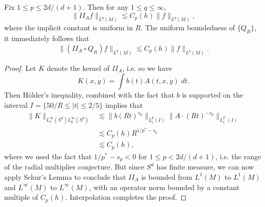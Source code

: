 \begin{lemma} \label{IIALemma}
    Fix $1 \leq p \leq 2d/(d+1)$. Then for any $1 \leq q \leq \infty$,
    \[ \| II_A f \|_{L^q(M)} \lesssim C_p(h) \| f \|_{L^q(M)}, \]
    where the implicit constant is uniform in $R$. The uniform boundedness of $\{ Q_R \}$, it immediately follows that
    \[ \| (II_A \circ Q_R) f \|_{L^q(M)} \lesssim C_p(h) \| f \|_{L^q(M)}. \]
\end{lemma}
\begin{proof}
    Let $K$ denote the kernel of $II_A$, i.e. so we have
    \[ K(x,y) = \int b(t) A(t,x,y)\; dt. \]
    Then H\"{o}lder's inequality, combined with the fact that $b$ is supported on the interval $I = \{ 50/R \leq |t| \leq 2/5 \}$ implies that
    \begin{align*}
        \| K \|_{L^\infty_x(S^d) L^\infty_y(S^d)} &\lesssim \| b (R t)^{s_p} \|_{L^p_t(I)} \| A \cdot (R t)^{-s_p} \|_{L^{p^*}_t(I)}\\
        &\lesssim C_p(h) R^{1/p^* - s_p}\\
        &\lesssim C_p(h),
    \end{align*}
    where we used the fact that $1/p^* - s_p < 0$ for $1 \leq p < 2d/(d+1)$, i.e. the range of the radial multiplier conjecture. But since $S^d$ has finite measure, we can now apply Schur's Lemma to conclude that $II_A$ is bounded from $L^1(M)$ to $L^1(M)$ and $L^\infty(M)$ to $L^\infty(M)$, with an operator norm bounded by a constant multiple of $C_p(h)$. Interpolation completes the proof.
\end{proof}

